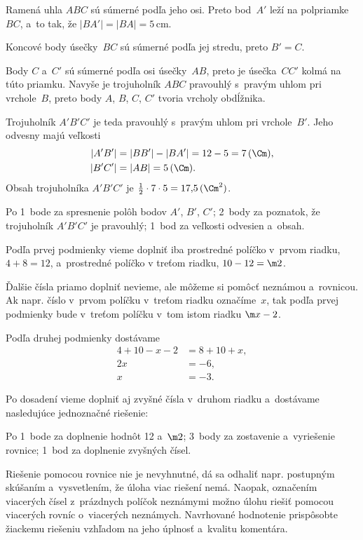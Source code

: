 {%
Ramená uhla $ABC$ sú súmerné podľa jeho osi.
Preto bod~$A'$ leží na polpriamke $BC$, a~to tak, že $|BA'|=|BA|=5$\,cm.

Koncové body úsečky~$BC$ sú súmerné podľa jej stredu, preto $B'=C$.

Body $C$ a~$C'$ sú súmerné podľa osi úsečky~$AB$, preto je úsečka~$CC'$ kolmá na túto priamku.
Navyše je trojuholník $ABC$ pravouhlý s~pravým uhlom pri vrchole~$B$,
preto body $A$, $B$, $C$, $C'$ tvoria vrcholy obdĺžnika.
%

Trojuholník $A'B'C'$ je teda pravouhlý s~pravým uhlom pri vrchole~$B'$.
Jeho odvesny majú veľkosti
$$
\begin{aligned}
\vert A'B'\vert&=\vert BB'\vert-\vert BA'\vert=12-5=7\,(\Cm), \\
\vert B'C'\vert&=\vert AB\vert=5\,(\Cm).
\end{aligned}
$$
Obsah trojuholníka $A'B'C'$ je $\frac12\cdot7\cdot5=17{,}5\,(\Cm^2)$.

\hodnotenie
Po 1~bode za spresnenie polôh bodov $A'$, $B'$, $C'$;
2~body za poznatok, že trojuholník $A'B'C'$ je pravouhlý;
1~bod za veľkosti odvesien a~obsah.
\endhodnotenie
}

{%
Podľa prvej podmienky vieme doplniť iba prostredné políčko v~prvom riadku, $4+8=12$,
a~prostredné políčko v treťom riadku, $10-12=\m2$.

Ďalšie čísla priamo doplniť nevieme, ale môžeme si pomôcť neznámou a~rovnicou.
Ak napr. číslo v~prvom políčku v~treťom riadku označíme~$x$, tak podľa prvej podmienky bude v~treťom políčku v~tom istom riadku $\m x-2$.
%

Podľa druhej podmienky dostávame
$$
\begin{aligned}
4+10-x-2&=8+10+x, \\
2x&=-6, \\
x&=-3.
\end{aligned}
$$

Po dosadení vieme doplniť aj zvyšné čísla v~druhom riadku a~dostávame nasledujúce jednoznačné riešenie:
%


\hodnotenie
Po 1~bode za doplnenie hodnôt 12 a~$\m2$;
3~body za zostavenie a~vyriešenie rovnice;
1~bod za doplnenie zvyšných čísel.

Riešenie pomocou rovnice nie je nevyhnutné, dá sa odhaliť napr. postupným skúšaním a~vysvetlením, že úloha viac riešení nemá.
Naopak, označením viacerých čísel z~prázdnych políčok neznámymi možno úlohu riešiť pomocou viacerých rovníc o~viacerých neznámych.
Navrhované hodnotenie prispôsobte žiackemu riešeniu vzhľadom na jeho úplnosť a~kvalitu komentára.
\endhodnotenie
}

